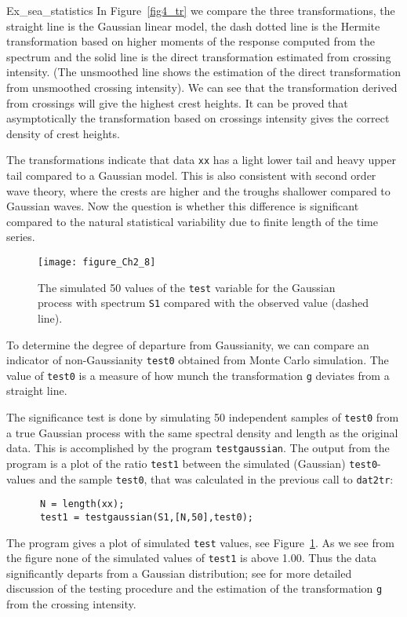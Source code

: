 \begin{cex}{Ex_sea_statistics}
In Figure~\ref{fig4_tr} we compare the three transformations,
the straight line is the Gaussian linear model, the dash dotted
line is the Hermite transformation based on higher moments of the
response computed from the spectrum and the solid line is the direct
transformation estimated from crossing intensity.
(The unsmoothed line shows the estimation of
the direct transformation from unsmoothed crossing intensity).
We can see that the transformation derived from crossings will give
the highest crest heights. It can be proved that asymptotically
the transformation based on crossings intensity gives the
correct density of crest heights.

The transformations indicate that data {\tt xx} has a light
lower tail and heavy
upper tail compared to a Gaussian model.
This is also consistent with  second order wave theory, where the crests
are higher and the troughs shallower compared to Gaussian waves.
Now the question is whether this difference is significant
compared to the natural statistical variability due to finite length
of the time series.

\begin{figure}[t]
\centering
\texttt{[image: figure\_Ch2\_8]}
\vspace{-3mm}
\caption[Simulation technique to test if a stochastic process is Gaussian]{
The simulated 50 values of the {\tt test} variable for
the Gaussian process with spectrum {\tt S1} compared with the
observed value (dashed line).}
  \label{fig2-3}
\end{figure}

To determine the degree of departure from Gaussianity,
we can compare an indicator of non-Gaussianity {\tt test0}
obtained from Monte Carlo simulation. The value
of {\tt test0} is a measure of how munch the transformation {\tt g}
deviates from a straight line.

The significance test is done by simulating 50 independent samples
of {\tt test0} from a true Gaussian process with the same spectral
density and length as the original data. This is accomplished
by the \progname{} program \verb+testgaussian+.
The output from the program is
a plot of the ratio \verb+test1+ between the simulated (Gaussian)
{\tt test0}-values and the sample {\tt test0}, that was calculated in the previous call to 
{\tt dat2tr}:
{\small\begin{verbatim}
      N = length(xx);
      test1 = testgaussian(S1,[N,50],test0);
\end{verbatim}}
\noindent
The program gives a plot of simulated {\tt test} values, see
Figure~\ref{fig2-3}. As we see from the figure none of the
simulated values of \verb+test1+ is above 1.00. Thus the data
significantly departs from a Gaussian distribution;
see \cite{RychlikEtal1997Modelling} for more detailed discussion
of the testing procedure and the estimation of the transformation
{\tt g} from the crossing intensity.


\end{cex}
